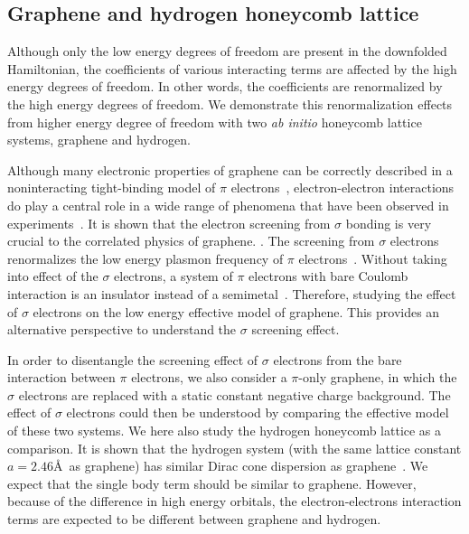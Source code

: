 \subsection{Graphene and hydrogen honeycomb lattice}
Although only the low energy degrees of freedom are present in the downfolded Hamiltonian, the coefficients of various interacting terms are affected by the high energy degrees of freedom. In other words, the coefficients are renormalized by the high energy degrees of freedom. We demonstrate this renormalization effects from higher energy degree of freedom with two \textit{ab initio} honeycomb lattice  systems, graphene and hydrogen. 

Although many electronic properties of graphene can be correctly described in a noninteracting tight-binding model of $\pi$ electrons~\cite{Castro2009}, electron-electron interactions do play a central role in a wide range of phenomena that have been observed in experiments~\cite{Kotov2012}. It is shown that the electron screening from $\sigma$ bonding is very crucial to the correlated physics of graphene. \cite{Zheng2016}. The screening from $\sigma$ electrons renormalizes the low energy plasmon frequency of $\pi$ electrons~\cite{Zheng2016}. Without taking into effect of the $\sigma$ electrons, a system of $\pi$ electrons with bare Coulomb interaction is an insulator instead of a semimetal~\cite{DrutPRL2009, DrutPRB2009,  Smith2014, Zheng2016}. Therefore, studying the effect of $\sigma$ electrons on the low energy effective model of graphene. This provides an alternative perspective to understand the $\sigma$ screening effect. 

In order to disentangle the screening effect of $\sigma$ electrons from the bare interaction between $\pi$ electrons, we also consider a $\pi$-only graphene, in which the $\sigma$ electrons are replaced with a static constant negative charge background. The effect of $\sigma$ electrons could then be understood by comparing the effective model of these two systems. 
We here also study the hydrogen honeycomb lattice as a comparison. It is shown that the hydrogen system (with the same lattice constant $a=2.46$\AA~as graphene) has similar Dirac cone dispersion as graphene~\cite{Zheng2016}. We expect that the single body term should be similar to graphene. However, because of the difference in high energy orbitals, the electron-electrons interaction terms are expected to be different between graphene and hydrogen. 

